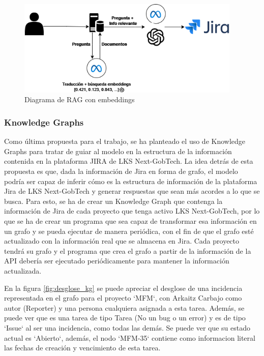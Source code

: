 \begin{figure}[H]
    \centering
    \includegraphics[width=0.95\textwidth]{images/rag_embeddings.png}
    \caption{Diagrama de RAG con embeddings}\label{fig:embeddings}
\end{figure}

\subsubsection{Knowledge Graphs}
Como última propuesta para el trabajo, se ha planteado el uso de Knowledge Graphs para tratar de guiar al modelo en la estructura de la información contenida en la plataforma JIRA de LKS Next-GobTech. La idea detrás de esta propuesta es que, dada la información de Jira en forma de grafo, el modelo podría ser capaz de inferir cómo es la estructura de información de la plataforma Jira de LKS Next-GobTech y generar respuestas que sean más acordes a lo que se busca. Para esto, se ha de crear un Knowledge Graph que contenga la información de Jira de cada proyecto que tenga activo LKS Next-GobTech, por lo que se ha de crear un programa que sea capaz de transformar esa información en un grafo y se pueda ejecutar de manera periódica, con el fin de que el grafo esté actualizado con la información real que se almacena en Jira. Cada proyecto tendrá su grafo y el programa que crea el grafo a partir de la información de la API debería ser ejecutado periódicamente para mantener la información actualizada.

En la figura \ref{fig:desglose_kg} se puede apreciar el desglose de una incidencia representada en el grafo para el proyecto `MFM`, con Arkaitz Carbajo como autor (Reporter) y una persona cualquiera asignada a esta tarea. Además, se puede ver que es una tarea de tipo Tarea (No un bug o un error) y es de tipo `Issue` al ser una incidencia, como todas las demás. Se puede ver que su estado actual es `Abierto`, además, el nodo `MFM-35` contiene como informacion literal las fechas de creación y vencimiento de esta tarea.


